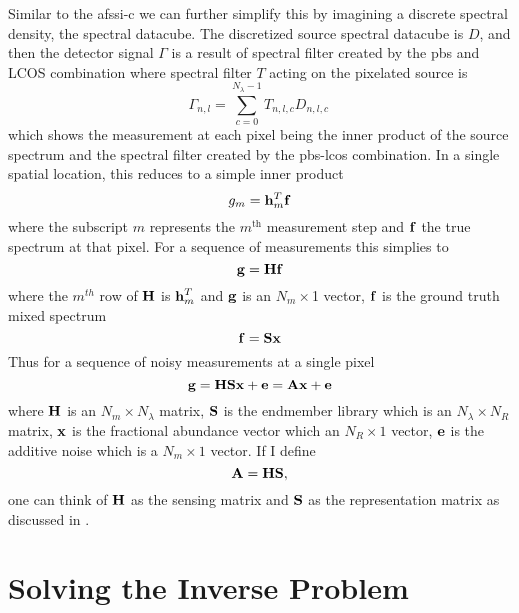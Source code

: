 Similar to the \gls{afssi-c} we can further simplify this by imagining a discrete spectral density, the spectral datacube. The discretized source spectral datacube is $D$, and then the detector signal $\Gamma$ is a result of spectral filter created by the \gls{pbs} and LCOS combination where spectral filter $T$ acting on the pixelated source is
%
%
\begin{equation}
	\Gamma_{n,l} = \sum^{N_{\lambda}-1}_{c = 0} T_{n,l,c} D_{n,l,c} \,
\end{equation}
%
%
which shows the measurement at each pixel being the inner product of the source spectrum and the spectral filter created by the \gls{pbs}-\gls{lcos} combination. In a single spatial location, this reduces to a simple inner product
%
\begin{equation}
	g_m = \displaystyle \mathbf{h}_m^{T} \displaystyle \mathbf{f} 
\end{equation}
%
where the subscript $m$ represents the $m^{\text{th}}$ measurement step and $\displaystyle \mathbf{f}$ the true spectrum at that pixel. For a sequence of measurements this simplies to 
%
\begin{equation}
	\displaystyle \mathbf{g} = \displaystyle \mathbf{H} \displaystyle \mathbf{f}
\end{equation}
%
where the $m^{th}$ row of $\displaystyle \mathbf{H}$ is $\displaystyle \mathbf{h}_m^T$ and $\displaystyle \mathbf{g}$ is an $N_m \times$1 vector, $\displaystyle \mathbf{f}$ is the ground truth mixed spectrum
%
\begin{equation}
	\displaystyle \mathbf{f} = \displaystyle \mathbf{S}\displaystyle \mathbf{x}
\end{equation}
%
Thus for a sequence of noisy measurements at a single pixel
%
\begin{equation}
	\displaystyle \mathbf{g} = \displaystyle \mathbf{H}\displaystyle \mathbf{S}\displaystyle \mathbf{x} + \displaystyle \mathbf{e} = \displaystyle \mathbf{A}\displaystyle \mathbf{x} + \displaystyle \mathbf{e}
\end{equation}\label{eq:csuForwardModel}
%
where $\displaystyle \mathbf{H}$ is an $N_m \times N_{\lambda}$ matrix, $\displaystyle \mathbf{S}$ is the endmember library which is an $N_{\lambda} \times N_{R}$ matrix, $\displaystyle \mathbf{x}$ is the fractional abundance vector which an $N_R \times 1$ vector, $\displaystyle \mathbf{e}$ is the additive noise which is a $N_m \times 1$ vector. If I define
%
\begin{equation}
	\displaystyle \mathbf{A} = \displaystyle \mathbf{H} \displaystyle \mathbf{S},
\end{equation}
%
one can think of $\displaystyle \mathbf{H}$ as the sensing matrix and $\displaystyle \mathbf{S}$ as the representation matrix as discussed in .


\section{Solving the Inverse Problem}

